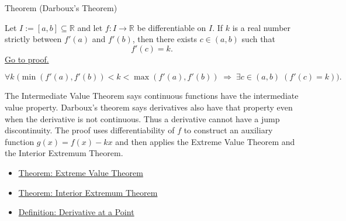 
\begin{theorembox}{Theorem (Darboux's Theorem)}
\begin{theorem}
\label{thm:darboux}
Let $I := [a,b] \subseteq \mathbb{R}$ and let $f : I \to \mathbb{R}$ be differentiable on $I$. If $k$ is a real number strictly between $f'(a)$ and $f'(b)$, then there exists $c \in (a,b)$ such that
\[
f'(c) = k.
\]
\hyperref[prf:darboux]{Go to proof.}
\end{theorem}
\end{theorembox}

\begin{remark*}
\[
\forall k\;\bigl(\min(f'(a),f'(b)) < k < \max(f'(a),f'(b))
\;\Rightarrow\; \exists c \in (a,b)\;(f'(c)=k)\bigr).
\]
\end{remark*}

\begin{remark*}[Interpretation]
The Intermediate Value Theorem says continuous functions have the intermediate
value property. Darboux's theorem says derivatives also have that property even
when the derivative is not continuous. Thus a derivative cannot have a jump
discontinuity. The proof uses differentiability of $f$ to construct an
auxiliary function $g(x)=f(x)-kx$ and then applies the Extreme Value Theorem
and the Interior Extremum Theorem.
\end{remark*}

\begin{dependencies}
\begin{itemize}
  \item \hyperref[thm:extreme-value-theorem]{Theorem: Extreme Value Theorem}
  \item \hyperref[thm:interior-extremum-theorem]{Theorem: Interior Extremum Theorem}
  \item \hyperref[def:derivative-at-a-point]{Definition: Derivative at a Point}
\end{itemize}
\end{dependencies}
